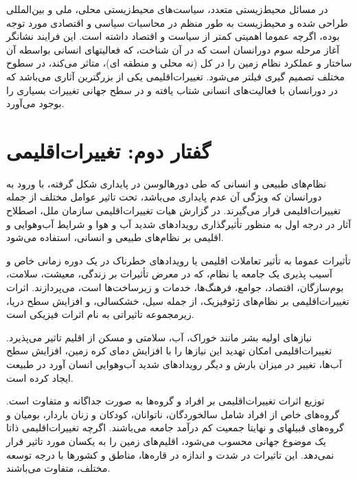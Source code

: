  در مسائل محیط‌زیستی متعدد، سیاست‌های محیط‌زیستی محلی، ملی و بین‌المللی طراحی شده و  محیط‌زیست به طور منظم در محاسبات سیاسی و اقتصادی مورد توجه بوده، اگرچه عموما اهمیتی کمتر از سیاست و اقتصاد داشته است. این فرایند نشانگر آغاز مرحله سوم دورانسان است که در آن شناخت، که فعالیتهای انسانی بواسطه آن ساختار و عملکرد نظام زمین را در کل (نه محلی و منطقه ای)، متاثر می‌کند، در سطوح مختلف تصمیم گیری فیلتر می‌شود. 
تغییرات‌اقلیمی یکی از بزرگترین آثاری می‌باشد که در دورانسان با فعالیت‌های انسانی شتاب یافته و در سطح جهانی تغییرات بسیاری را بوجود می‌آورد.









\section*{گفتار دوم: تغییرات‌اقلیمی}
نظام‌های طبیعی و انسانی که طی دور‌هالوسن در پایداری شکل گرفته، با ورود به دورانسان که ویژگی آن عدم پایداری می‌باشد، تحت تاثیر عوامل مختلف از جمله تغییرات‌اقلیمی قرار می‌گیرند. در گزارش هیات تغییرات‌اقلیمی سازمان ملل، اصطلاح آثار در درجه اول به منظور تأثیرگذاری رویدادهای شدید آب و هوا و شرایط آب‌و‌هوایی و ‌اقلیمی بر نظام‌های طبیعی و انسانی، استفاده می‌شود. 

تأثیرات عموما به تأثیر تعاملات ‌اقلیمی یا رویدادهای خطرناک در یک دوره زمانی خاص و آسیب پذیری یک جامعه یا نظام، که در معرض تأثیرات بر زندگی، معیشت، سلامت، بوم‌سازگان، اقتصاد، جوامع، فرهنگ‌ها، خدمات و زیرساخت‌ها است، می‌پردازند. اثرات تغییرات‌اقلیمی بر نظام‌های ژئوفیزیک، از جمله سیل، خشکسالی، و افزایش سطح دریا، زیرمجموعه تاثیراتی به نام اثرات فیزیکی است.


نیاز‌های اولیه بشر مانند خوراک، آب، سلامتی و مسکن از اقلیم تاثیر می‌پذیرد. تغییرات‌اقلیمی امکان تهدید این نیاز‌ها را با افزایش دمای کره زمین، افزایش سطح آب‌ها، تغییر در میزان بارش و دیگر رویداد‌های شدید آب‌و‌هوایی  انسان آورد در طبیعت ایجاد کرده است.


توزیع اثرات  تغییرات‌اقلیمی بر افراد و گروه‌ها به صورت جداگانه و متفاوت است. گروه‌های خاص از افراد شامل سالخوردگان، ناتوانان، کودکان و زنان باردار، بومیان و گروه‌های قبیلهای و نهایتا جمعیت کم درآمد جامعه می‌باشند. اگر‌چه تغییرات‌اقلیمی ذاتا یک موضوع جهانی محسوب می‌شود، اقلیم‌های زمین را به یکسان مورد تاثیر قرار نمی‌دهد.  این تاثیرات در شدت و ‌اندازه در قاره‌ها، مناطق و کشور‌ها با درجه توسعه مختلف، متفاوت می‌باشند. 


